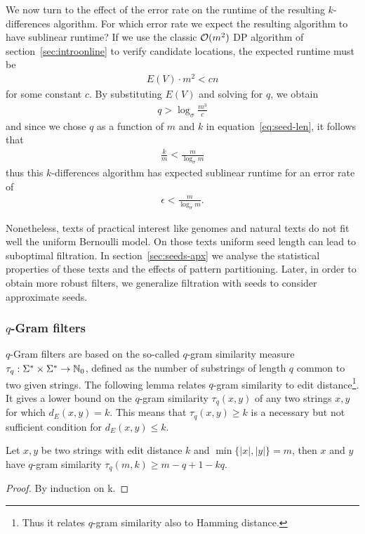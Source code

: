 We now turn to the effect of the error rate on the runtime of the resulting $k$-differences algorithm.
For which error rate we expect the resulting algorithm to have sublinear runtime?
If we use the classic $\mathcal{O}(m^2)$ DP algorithm of section~\ref{sec:introonline} to verify candidate locations, the expected runtime must be
\begin{eqnarray}
E(V) \cdot m^2 < cn
\end{eqnarray}
for some constant $c$.
By substituting $E(V)$ and solving for $q$, we obtain
\begin{eqnarray}
q > \log_{\sigma}{\frac{m^3}{c}}
\end{eqnarray}
and since we chose $q$ as a function of $m$ and $k$ in equation~\ref{eq:seed-len}, it follows that
\begin{eqnarray}
\frac{k}{m} < \frac{m}{\log_{\sigma}{m}}
\end{eqnarray}
thus this $k$-differences algorithm has expected sublinear runtime for an error rate of
\begin{eqnarray}
\epsilon < \frac{m}{\log_{\sigma}{m}}.
\end{eqnarray}

Nonetheless, texts of practical interest like genomes and natural texts do not fit well the uniform Bernoulli model.
On those texts uniform seed length can lead to suboptimal filtration.
In section~\ref{sec:seeds-apx} we analyse the statistical properties of these texts and the effects of pattern partitioning.
Later, in order to obtain more robust filters, we generalize filtration with seeds to consider approximate seeds.

\subsubsection{$q$-Gram filters}

$q$-Gram filters are based on the so-called $q$-gram similarity measure $\tau_q : \Sigma^{*} \times \Sigma^{*} \rightarrow \mathbb {N}_0$, defined as the number of substrings of length $q$ common to two given strings.
The following lemma relates $q$-gram similarity to edit distance\footnote{Thus it relates $q$-gram similarity also to Hamming distance.}.
It gives a lower bound on the $q$-gram similarity $\tau_q(x,y)$ of any two strings $x,y$ for which $d_E(x,y) = k$.
This means that $\tau_q(x,y) \geq k$ is a necessary but not sufficient condition for $d_E(x,y) \leq k$.
\begin{lemma}
\label{lemma:qgrams}
\citep{Jokinen1991}
Let $x,y$ be two strings with edit distance $k$ and $\min\{|x|,|y|\} = m$, then $x$ and $y$ have $q$-gram similarity $\tau_q(m,k) \geq m - q + 1 - kq$.
\end{lemma}
\begin{proof}
By induction on k.
\end{proof}

